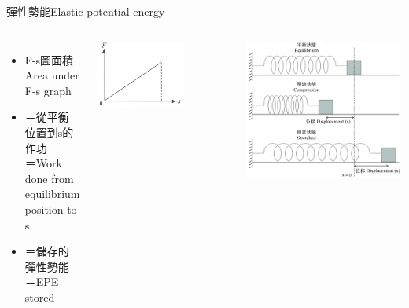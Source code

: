 \documentclass[beamer=true]{standalone}
\begin{document}
\begin{frame}{彈性勢能Elastic potential energy}
    \begin{columns}
        \begin{itemize}
            \setlength{\itemsep}{12pt}
            \item F-s圖面積\\Area under F-s graph
            \item []＝從平衡位置到s的作功\\＝Work done from equilibrium position to s
            \item []＝儲存的彈性勢能\\＝EPE stored
        \end{itemize}\bigskip
        {\par\centering
            \includegraphics[width=0.66\textwidth]{assets/80e4b012.png}
            \par}
        {\par\centering
            \includegraphics[width=\textwidth]{assets/5c1cf9fc.png}
            \par}
    \end{columns}
\end{frame}
\end{document}
